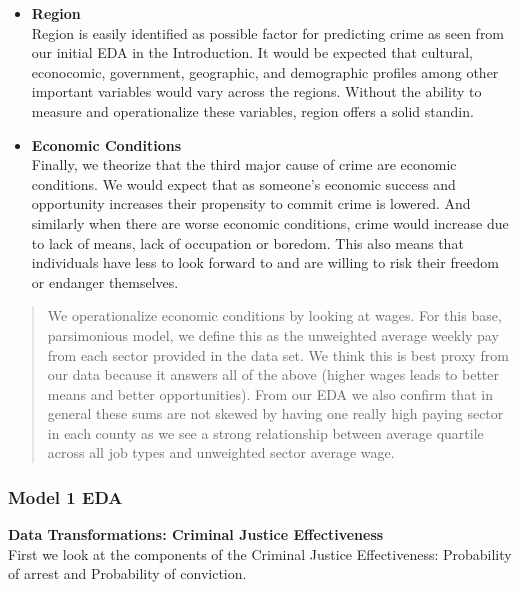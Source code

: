 \documentclass[]{article}
\begin{document}
\begin{itemize}
\item
  \textbf{Region}\\
  Region is easily identified as possible factor for predicting crime as
  seen from our initial EDA in the Introduction. It would be expected
  that cultural, econocomic, government, geographic, and demographic
  profiles among other important variables would vary across the
  regions. Without the ability to measure and operationalize these
  variables, region offers a solid standin.
\item
  \textbf{Economic Conditions}\\
  Finally, we theorize that the third major cause of crime are economic
  conditions. We would expect that as someone's economic success and
  opportunity increases their propensity to commit crime is lowered. And
  similarly when there are worse economic conditions, crime would
  increase due to lack of means, lack of occupation or boredom. This
  also means that individuals have less to look forward to and are
  willing to risk their freedom or endanger themselves.
\end{itemize}

\begin{quote}
We operationalize economic conditions by looking at wages. For this
base, parsimonious model, we define this as the unweighted average
weekly pay from each sector provided in the data set. We think this is
best proxy from our data because it answers all of the above (higher
wages leads to better means and better opportunities). From our EDA we
also confirm that in general these sums are not skewed by having one
really high paying sector in each county as we see a strong relationship
between average quartile across all job types and unweighted sector
average wage.
\end{quote}

\hypertarget{model-1-eda}{%
\subsubsection{Model 1 EDA}\label{model-1-eda}}

\textbf{Data Transformations: Criminal Justice Effectiveness}\\
First we look at the components of the Criminal Justice Effectiveness:
Probability of arrest and Probability of conviction.
\end{document}
